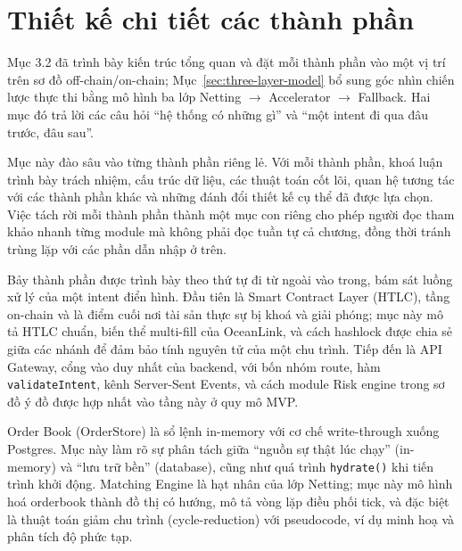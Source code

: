 
\section{Thiết kế chi tiết các thành phần}
\label{sec:detailed-components}

Mục 3.2 đã trình bày kiến trúc tổng quan và đặt mỗi thành phần vào một vị trí trên sơ đồ off-chain/on-chain; Mục~\ref{sec:three-layer-model} bổ sung góc nhìn chiến lược thực thi bằng mô hình ba lớp Netting $\rightarrow$ Accelerator $\rightarrow$ Fallback. Hai mục đó trả lời các câu hỏi ``hệ thống có những gì'' và ``một intent đi qua đâu trước, đâu sau''.

Mục này đào sâu vào từng thành phần riêng lẻ. Với mỗi thành phần, khoá luận trình bày trách nhiệm, cấu trúc dữ liệu, các thuật toán cốt lõi, quan hệ tương tác với các thành phần khác và những đánh đổi thiết kế cụ thể đã được lựa chọn. Việc tách rời mỗi thành phần thành một mục con riêng cho phép người đọc tham khảo nhanh từng module mà không phải đọc tuần tự cả chương, đồng thời tránh trùng lặp với các phần dẫn nhập ở trên.

Bảy thành phần được trình bày theo thứ tự đi từ ngoài vào trong, bám sát luồng xử lý của một intent điển hình. Đầu tiên là Smart Contract Layer (HTLC), tầng on-chain và là điểm cuối nơi tài sản thực sự bị khoá và giải phóng; mục này mô tả HTLC chuẩn, biến thể multi-fill của OceanLink, và cách hashlock được chia sẻ giữa các nhánh để đảm bảo tính nguyên tử của một chu trình. Tiếp đến là API Gateway, cổng vào duy nhất của backend, với bốn nhóm route, hàm \texttt{validateIntent}, kênh Server-Sent Events, và cách module Risk engine trong sơ đồ ý đồ được hợp nhất vào tầng này ở quy mô MVP.

Order Book (OrderStore) là sổ lệnh in-memory với cơ chế write-through xuống Postgres. Mục này làm rõ sự phân tách giữa ``nguồn sự thật lúc chạy'' (in-memory) và ``lưu trữ bền'' (database), cũng như quá trình \texttt{hydrate()} khi tiến trình khởi động. Matching Engine là hạt nhân của lớp Netting; mục này mô hình hoá orderbook thành đồ thị có hướng, mô tả vòng lặp điều phối tick, và đặc biệt là thuật toán giảm chu trình (cycle-reduction) với pseudocode, ví dụ minh hoạ và phân tích độ phức tạp.


